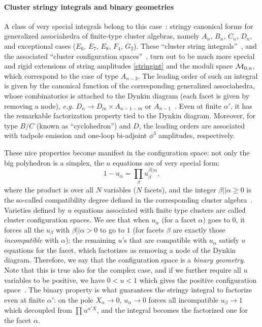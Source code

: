 \documentclass[hidelinks,12pt]{article}
\begin{document}
\paragraph{Cluster stringy integrals and binary geometries} A class of very special integrals belong to this case~\cite{Arkani-Hamed:2019plo}: stringy canonical forms for generalized associahedra of finite-type cluster algebras, namely $A_n$, $B_n$, $C_n$, $D_n$, and exceptional cases ($E_6$, $E_7$, $E_8$, $F_4$, $G_2$). These ``cluster string integrals''~\cite{Arkani-Hamed:2019plo}, and the associated ``cluster configuration spaces''~\cite{Arkani-Hamed:2019plo,Arkani-Hamed:tobeappear}, turn out to be much more special and rigid extensions of string amplitudes \eqref{stringint} and the moduli space ${\cal M}_{0,n}$, which correspond to the case of type $A_{n{-}3}$. The leading order of such an integral is given by the canonical function of the corresponding generalized associahedra, whose combinatorics is attached to the Dynkin diagram (each facet is given by removing a node), {\it e.g.} $D_n \to D_m \times A_{n{-}1{-}m}$ or $A_{n{-}1}$~\cite{Arkani-Hamed:2019plo}. Even at finite $\alpha'$, it has the remarkable factorization property tied to the Dynkin diagram. Moreover, for type $B/C$ (known as ``cyclohedron'') and $D$, the leading orders are associated with tadpole emission and one-loop bi-adjoint $\phi^3$ amplitudes, respectively.

These nice properties become manifest in the configuration space: not only the big polyhedron is a simplex, the $u$ equations are of very special form:
\begin{equation}\label{perfectu}
	1-u_\alpha=\prod_{\beta} u_\beta^{\beta||\alpha},
\end{equation}
where the product is over all $N$ variables ($N$ facets), and the integer $\beta || \alpha\geq 0$ is the so-called compatibility degree defined in the corresponding cluster algebra~\cite{Zelevinskysys}. Varieties defined by $u$ equations associated with finite type clusters  are called cluster configuration spaces.
We see that when $u_\alpha$ (for a facet $\alpha$) goes to $0$, it forces all the $u_\beta$ with $\beta || \alpha>0$ to go to $1$ (for facets $\beta$ are exactly those {\it incompatible} with $\alpha$); the remaining $u$'s that are compatible with $u_\alpha$ satisfy $u$ equations for the facet, which factorizes as removing a node of the Dynkin diagram. Therefore, we say that the configuration space is a {\it binary geometry}. Note that this is true also for the complex case, and if we further require all $u$ variables to be positive, we have $0<u<1$ which gives the positive configuration space~\cite{Arkani-Hamed:2020cig}. The binary property is what guarantees the stringy integral to factorize even at finite $\alpha'$: on the pole $X_\alpha \to 0$, $u_\alpha\to 0$ forces all incompatible $u_\beta\to 1$ which decoupled from $\prod u^{\alpha' X}$, and the integral becomes the factorized one for the facet $\alpha$. 
\end{document}
